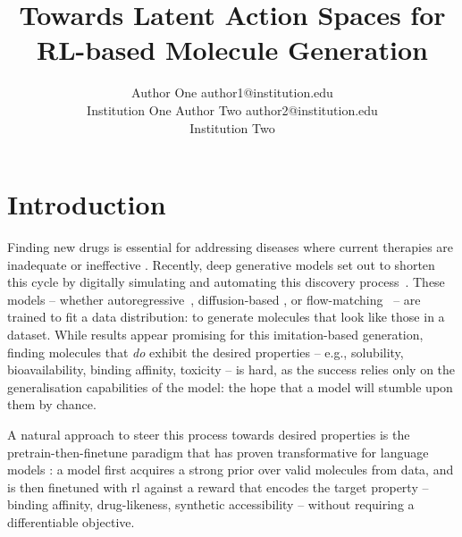 \documentclass[10pt]{article} %
\title{Towards Latent Action Spaces for RL-based Molecule Generation}
\author{\name Author One \email author1@institution.edu \\
      \addr Institution One
      \AND
      \name Author Two \email author2@institution.edu \\
      \addr Institution Two}
\begin{document}
\maketitle

\begin{abstract}
\end{abstract}


\section{Introduction}

Finding new drugs is essential for addressing diseases where current therapies are inadequate or ineffective \citep{singh2023drug}.
%
Recently, deep generative models set out to shorten this cycle by digitally simulating and automating this discovery process~\citep{atomwise2024ai,zhavoronkov2019deep,stokes2020deep,zeng2022deep}.
These models -- whether autoregressive~\citep{bagal2022molgpt}, diffusion-based \citep{vignac2023midi,cornet2024equivariant}, or flow-matching~\citep{dunn_mixed_2024} -- are trained to fit a data distribution: to generate molecules that look like those in a dataset.
While results appear promising for this imitation-based generation, finding molecules that \textit{do} exhibit the desired properties -- e.g., solubility, bioavailability, binding affinity, toxicity -- is hard, as the success relies only on the generalisation capabilities of the model: the hope that a model will stumble upon them by chance.

A natural approach to steer this process towards desired properties is the pretrain-then-finetune paradigm that has proven transformative for language models \citep{ouyang2022training}: a model first acquires a strong prior over valid molecules from data, and is then finetuned with \gls{rl} against a reward that encodes the target property -- binding affinity, drug-likeness, synthetic accessibility -- without requiring a differentiable objective.
\end{document}
